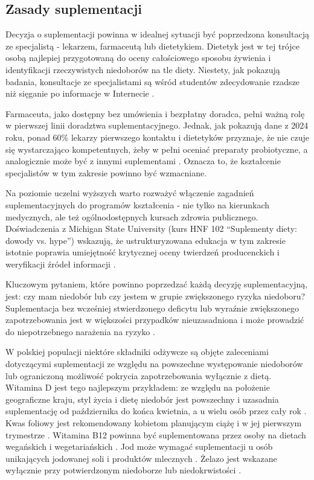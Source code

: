 \subsection{Zasady suplementacji}


Decyzja o suplementacji powinna w idealnej sytuacji być poprzedzona konsultacją ze specjalistą - lekarzem, farmaceutą lub dietetykiem. Dietetyk jest w tej trójce osobą najlepiej przygotowaną do oceny całościowego sposobu żywienia i identyfikacji rzeczywistych niedoborów na tle diety. Niestety, jak pokazują badania, konsultacje ze specjalistami są wśród studentów zdecydowanie rzadsze niż sięganie po informacje w Internecie \cite{vzevzelj2018prevalence,sicinska2022dietary}.

Farmaceuta, jako dostępny bez umówienia i bezpłatny doradca, pełni ważną rolę w pierwszej linii doradztwa suplementacyjnego. Jednak, jak pokazują dane z 2024 roku, ponad 60\% lekarzy pierwszego kontaktu i dietetyków przyznaje, że nie czuje się wystarczająco kompetentnych, żeby w pełni oceniać preparaty probiotyczne, a analogicznie może być z innymi suplementami \cite{hill2014expert}. Oznacza to, że kształcenie specjalistów w tym zakresie powinno być wzmacniane.

Na poziomie uczelni wyższych warto rozważyć włączenie zagadnień suplementacyjnych do programów kształcenia - nie tylko na kierunkach medycznych, ale też ogólnodostępnych kursach zdrowia publicznego. Doświadczenia z Michigan State University (kurs HNF 102 \enquote{Suplementy diety: dowody vs. hype}) wskazują, że ustrukturyzowana edukacja w tym zakresie istotnie poprawia umiejętność krytycznej oceny twierdzeń producenckich i weryfikacji źródeł informacji \cite{becker2024development}.


Kluczowym pytaniem, które powinno poprzedzać każdą decyzję suplementacyjną, jest: czy mam niedobór lub czy jestem w grupie zwiększonego ryzyka niedoboru? Suplementacja bez wcześniej stwierdzonego deficytu lub wyraźnie zwiększonego zapotrzebowania jest w większości przypadków nieuzasadniona i może prowadzić do niepotrzebnego narażenia na ryzyko \cite{jarosz2020normy}.

W polskiej populacji niektóre składniki odżywcze są objęte zaleceniami dotyczącymi suplementacji ze względu na powszechne występowanie niedoborów lub ograniczoną możliwość pokrycia zapotrzebowania wyłącznie z dietą. Witamina D jest tego najlepszym przykładem: ze względu na położenie geograficzne kraju, styl życia i dietę niedobór jest powszechny i uzasadnia suplementację od października do końca kwietnia, a u wielu osób przez cały rok \cite{pludowski2023guidelines}. Kwas foliowy jest rekomendowany kobietom planującym ciążę i w jej pierwszym trymestrze \cite{jarosz2020normy}. Witamina B12 powinna być suplementowana przez osoby na dietach wegańskich i wegetariańskich \cite{tardy2020vitamins}. Jod może wymagać suplementacji u osób unikających jodowanej soli i produktów mlecznych \cite{jarosz2020normy}. Żelazo jest wskazane wyłącznie przy potwierdzonym niedoborze lub niedokrwistości \cite{iolascon2024recommendations}.

